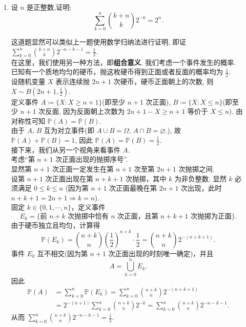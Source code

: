 \begin{enumerate}
    \item[6.]设 \(n\) 是正整数,证明:
    \[\displaystyle\sum_{k = 0}^{n}\binom{k + n}{k} 2^{-k} = 2^{n}.\]
    \begin{solution}
        这道题显然可以类似上一题使用数学归纳法进行证明, 即证 $\displaystyle \sum_{k = 0}^{n}\binom{k + n}{k} 2^{-n-k-1} = \frac{1}{2}$. \\
        在这里，我们使用另一种方法，即\textbf{组合意义}. 我们考虑一个事件发生的概率. \\
        已知有一个质地均匀的硬币，抛这枚硬币得到正面或者反面的概率均为 $\displaystyle \frac{1}{2}$.\\
        设随机变量 $X$ 表示连续抛 $2n+1$ 次硬币，硬币正面朝上的次数, 则 $\displaystyle X\sim B\left( 2n+1,\frac{1}{2} \right)$.\\
        定义事件 $A\coloneqq \{X : X\geq n+1\}$(即至少 $n+1$ 次正面), $B\coloneqq \{X : X\leq n\}$(即至少 $n+1$ 次反面, 
        因为反面朝上次数为 $2n+1-X\geq n+1$ 等价于 $X\leq n$). 由对称性可知 $\mathbb{P}(A)=\mathbb{P}(B)$.\\
        由于 $A,\,B$ 互为对立事件(即 $A\cup B=\Omega,\,A\cap B =\varnothing$.), 故 $\mathbb{P}(A)+\mathbb{P}(B)=1$, 
        因此 $\displaystyle \mathbb{P}(A)=\mathbb{P}(B)=\frac{1}{2}$.\\
        接下来，我们从另一个视角来看事件 $A$.\\
        考虑“第 \(n+1\) 次正面出现的抛掷序号”.\\
        显然第 \(n+1\) 次正面一定发生在第 \(n+1\) 次至第 \(2n+1\) 次抛掷之间.\\
        设第 \(n+1\) 次正面出现在第 \(n+k+1\) 次抛掷，其中 \(k\) 为非负整数.
        显然 \(k\) 必须满足 \(0\le k\le n\) (因为第 \(n+1\) 次正面最晚在第 \(2n+1\) 次出现，此时 \(n+k+1=2n+1 \Rightarrow k=n\)).\\
        固定 \(k\in\{0,1,\cdots,n\}\)，定义事件
        \[
        E_k = \{\text{前 }n+k\text{ 次抛掷中恰有 }n\text{ 次正面，且第 }n+k+1\text{ 次抛掷为正面}\}.
        \]
        由于硬币独立且均匀，计算得
        \[
        \mathbb{P}(E_k) = \binom{n+k}{n} \left(\frac12\right)^{n+k} \cdot \frac12
        = \binom{n+k}{n} 2^{-(n+k+1)}. \tag{2}
        \]
        事件 \(E_k\) 互不相交(因为第 \(n+1\) 次正面出现的时刻唯一确定)，并且
        \[
        A = \bigcup_{k=0}^{n} E_k.
        \]
        因此
        \[
        \begin{aligned}
            \mathbb{P}(A) &= \sum_{k=0}^{n} \mathbb{P}(E_k)= \sum_{k=0}^{n} \binom{n+k}{n} 2^{-(n+k+1)}\\
        &= 2^{-(n+1)} \sum_{k=0}^{n} \binom{n+k}{n} 2^{-k}=\sum_{k=0}^{n} \binom{n+k}{n} 2^{-n-k-1}.
        \end{aligned}
        \]
        从而 $\displaystyle \sum_{k=0}^{n} \binom{n+k}{n} 2^{-n-k-1}=\frac{1}{2}$.
    \end{solution}
    

\end{enumerate}
